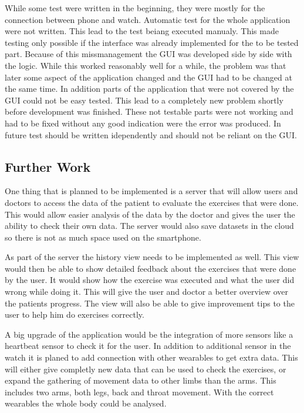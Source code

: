 While some test were written in the beginning, they were mostly for the connection between phone and watch. Automatic test for the whole application were not written. This lead to the test beiang executed manualy. This made testing only possible if the interface was already implemented for the to be tested part.
Because of this missmanagement the GUI was developed side by side with the logic. While this worked reasonably well for a while, the problem was that later some aspect of the application changed and the GUI had to be changed at the same time.
In addition parts of the application that were not covered by the GUI could not be easy tested. This lead to a completely new problem shortly before development was finished. These not testable parts were not working and had to be fixed without any good indication were the error was produced.
In future test should be written idependently and should not be reliant on the GUI.

\subsection{Further Work}
One thing that is planned to be implemented is a server that will allow users and doctors to access the data of the patient to evaluate the exercises that were done. This would allow easier analysis of the data by the doctor and gives the user the ability to check their own data.
The server would also save datasets in the cloud so there is not as much space used on the smartphone.

As part of the server the history view needs to be implemented as well. This view would then be able to show detailed feedback about the exercises that were done by the user. It would show how the exercise was executed and what the user did wrong while doing it. This will give the user and doctor a better overview over the patients progress. The view will also be able to give improvement tips to the user to help him do exercises correctly.

A big upgrade of the application would be the integration of more sensors like a heartbeat sensor to check it for the user. In addition to additional sensor in the watch it is planed to add connection with other wearables to get extra data. This will either give completly new data that can be used to check the exercises, or expand the gathering of movement data to other limbs than the arms. This includes two arms, both legs, back and throat movement. With the correct wearables the whole body could be analysed.

